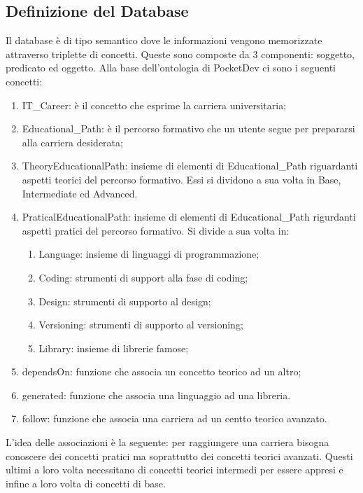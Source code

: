 \subsection{Definizione del Database}
Il database è di tipo semantico dove le informazioni vengono memorizzate attraverso triplette di concetti. Queste sono composte da 3 componenti: soggetto, predicato ed oggetto. Alla base dell'ontologia di PocketDev ci sono i seguenti concetti:
\begin{enumerate}
 \item IT\_Career: è il concetto che esprime la carriera universitaria;
 \item Educational\_Path: è il percorso formativo che un utente segue per prepararsi alla carriera desiderata;
 \item TheoryEducationalPath: insieme di elementi di Educational\_Path riguardanti aspetti teorici del percorso formativo. Essi si dividono a sua volta in Base, Intermediate ed Advanced.
 \item PraticalEducationalPath: insieme di elementi di Educational\_Path rigurdanti aspetti pratici del percorso formativo. Si divide a sua volta in:
 \begin{enumerate}
  \item Language: insieme di linguaggi di programmazione;
  \item Coding: strumenti di support alla fase di coding;
  \item Design: strumenti di supporto al design;
  \item Versioning: strumenti di supporto al versioning;
  \item Library: insieme di librerie famose;
 \end{enumerate}
 \item dependsOn: funzione che associa un concetto teorico ad un altro;
 \item generated: funzione che associa una linguaggio ad una libreria.
 \item follow: funzione che associa una carriera ad un centto teorico avanzato.
\end{enumerate}
L'idea delle associazioni è la seguente: per raggiungere una carriera bisogna conoscere dei concetti pratici ma soprattutto dei concetti teorici avanzati. Questi ultimi a loro volta necessitano di concetti teorici intermedi per essere appresi e infine a loro volta di concetti di base.

